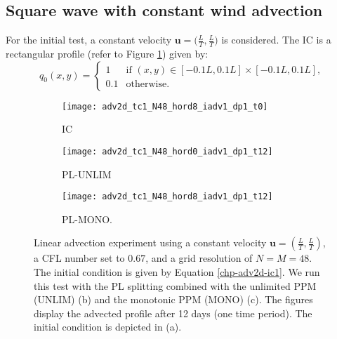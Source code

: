 \subsection{Square wave with constant wind advection}
For the initial test, a constant velocity $\boldsymbol{u}=\big(\frac{L}{T},\frac{L}{T}\big)$ is considered.
The IC is a rectangular profile (refer to Figure \ref{chp-adv2d-sec-exp-adv1-a}) given by:
\begin{equation}
	\label{chp-adv2d-ic1}
	q_0(x,y) =  
	\begin{cases}
		1 & \text{if } (x,y) \in [-0.1L,0.1L]\times [-0.1L,0.1L],\\
		0.1 & \text{otherwise}.
	\end{cases}
\end{equation}
\begin{figure}[!htb]
	\centering
	\begin{subfigure}{0.3\textwidth}
		\centering
		\texttt{[image: adv2d\_tc1\_N48\_hord8\_iadv1\_dp1\_t0]}
		\caption{IC\label{chp-adv2d-sec-exp-adv1-a}}
	\end{subfigure}
	\begin{subfigure}{0.3\textwidth}
		\centering
		\texttt{[image: adv2d\_tc1\_N48\_hord0\_iadv1\_dp1\_t12]}
		\caption{PL-UNLIM\label{chp-adv2d-sec-exp-adv1-b}}
	\end{subfigure}
	\begin{subfigure}{0.3\textwidth}
		\centering
		\texttt{[image: adv2d\_tc1\_N48\_hord8\_iadv1\_dp1\_t12]}
		\caption{PL-MONO.\label{chp-adv2d-sec-exp-adv1-c}}
	\end{subfigure}	
	\caption{Linear advection experiment using a constant velocity $\boldsymbol{u} = \left(\frac{L}{T},\frac{L}{T}\right)$, 
	a CFL number set to $0.67$, and a grid resolution of $N=M=48$.
	The initial condition is given by Equation \eqref{chp-adv2d-ic1}.
	We run this test with the PL splitting combined with the unlimited PPM (UNLIM) (b) and the monotonic PPM (MONO) (c).
        The figures display the advected profile after 12 days (one time period).
        The initial condition is depicted in (a). \label{chp-adv2d-sec-exp-adv1}}
\end{figure}

